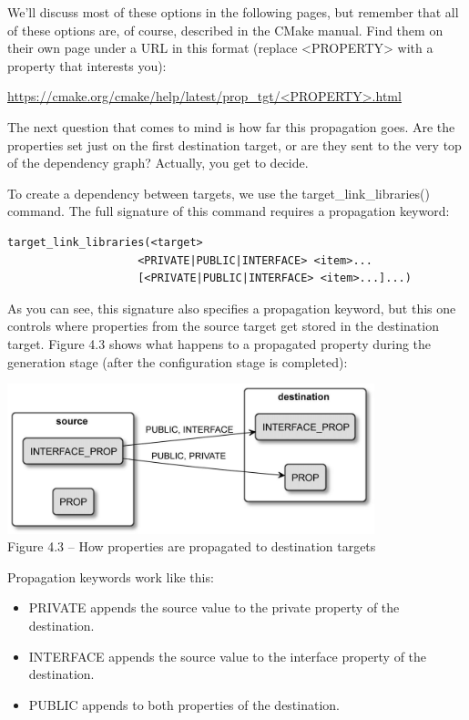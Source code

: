 We'll discuss most of these options in the following pages, but remember that all of these options are, of course, described in the CMake manual. Find them on their own page under a URL in this format (replace <PROPERTY> with a property that interests you): 

\url{https://cmake.org/cmake/help/latest/prop_tgt/<PROPERTY>.html}

The next question that comes to mind is how far this propagation goes. Are the properties set just on the first destination target, or are they sent to the very top of the dependency graph? Actually, you get to decide.

To create a dependency between targets, we use the target\_link\_libraries() command. The full signature of this command requires a propagation keyword:

\begin{lstlisting}[style=styleCMake]
target_link_libraries(<target>
					<PRIVATE|PUBLIC|INTERFACE> <item>...
					[<PRIVATE|PUBLIC|INTERFACE> <item>...]...)
\end{lstlisting}

As you can see, this signature also specifies a propagation keyword, but this one controls where properties from the source target get stored in the destination target. Figure 4.3 shows what happens to a propagated property during the generation stage (after the configuration stage is completed):

\begin{center}
\includegraphics[width=0.8\textwidth]{content/2/chapter4/images/3.jpg}\\
Figure 4.3 – How properties are propagated to destination targets
\end{center}

Propagation keywords work like this:

\begin{itemize}
\item 
PRIVATE appends the source value to the private property of the destination.

\item 
INTERFACE appends the source value to the interface property of the destination.

\item 
PUBLIC appends to both properties of the destination.
\end{itemize}


